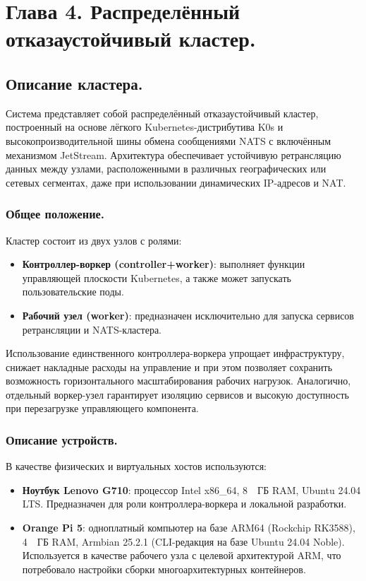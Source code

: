 \documentclass[14pt, a4paper]{extreport}
\begin{document}
\chapter{Глава 4. Распределённый отказаустойчивый кластер.}

\section{Описание кластера.}

Система представляет собой распределённый отказаустойчивый кластер, построенный на основе лёгкого Kubernetes-дистрибутива K0s и высокопроизводительной шины обмена сообщениями NATS с
включённым механизмом JetStream. Архитектура обеспечивает устойчивую ретрансляцию данных между узлами, расположенными в различных географических или сетевых сегментах, даже при
использовании динамических IP-адресов и NAT.

\subsection{Общее положение.}

Кластер состоит из двух узлов с ролями:
\begin{itemize}
\item \textbf{Контроллер-воркер (controller+worker)}: выполняет функции управляющей плоскости Kubernetes, а также может запускать пользовательские поды.
\item \textbf{Рабочий узел (worker)}: предназначен исключительно для запуска сервисов ретрансляции и NATS-кластера.
\end{itemize}

Использование единственного контроллера-воркера упрощает инфраструктуру, снижает накладные расходы на управление и при этом позволяет сохранить возможность горизонтального масштабирования рабочих нагрузок. Аналогично, отдельный воркер-узел гарантирует изоляцию сервисов и высокую доступность при перезагрузке управляющего компонента.

\subsection{Описание устройств.}

В качестве физических и виртуальных хостов используются:
\begin{itemize}
\item \textbf{Ноутбук Lenovo G710}: процессор Intel x86\_64, 8~~ГБ RAM, Ubuntu 24.04 LTS. Предназначен для роли контроллера-воркера и локальной разработки.
\item \textbf{Orange Pi 5}: одноплатный компьютер на базе ARM64 (Rockchip RK3588), 4~~ГБ RAM, Armbian 25.2.1 (CLI-редакция на базе Ubuntu 24.04 Noble). Используется в качестве рабочего узла с целевой архитектурой ARM, что потребовало настройки сборки многоархитектурных контейнеров.
\end{itemize}
\end{document}
